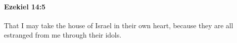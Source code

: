 
		\paragraph{Ezekiel 14:5} %
			\label{EZEKIEL-14-5}

			That I may take the house of Israel in their own heart, because they are all estranged from me through their idols.


